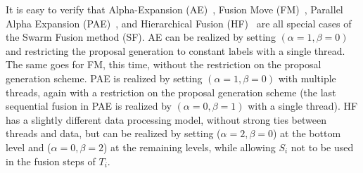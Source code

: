 \noindent It is easy to verify that Alpha-Expansion
(AE)~\cite{alpha_expansion}, Fusion Move
(FM)~\cite{fusion_moves_for_markov_random_field_optimization},
Parallel Alpha Expansion
(PAE)~\cite{fusion_moves_for_markov_random_field_optimization},
and Hierarchical Fusion
(HF)~\cite{delong_hierarchical_fusion,olga_hierarchical_alpha_expansion}
are all special cases of the Swarm Fusion method (SF). AE
can be realized by setting $(\alpha=1, \beta=0)$ and
restricting the proposal generation to constant labels with
a single thread. The same goes for FM, this time, without
the restriction on the proposal generation scheme. PAE is
realized by setting $(\alpha=1,\beta=0)$ with multiple
threads, again with a restriction on the proposal generation
scheme (the last sequential fusion in PAE is realized by
$(\alpha=0, \beta=1)$ with a single thread).
%
HF has a slightly different data processing model, without strong ties
between threads and data, but can be realized by setting ($\alpha=2,
\beta=0$) at the bottom level and ($\alpha=0, \beta=2$) at the remaining
levels, while allowing $S_i$ not to be used in the fusion steps of
$T_i$.





%

